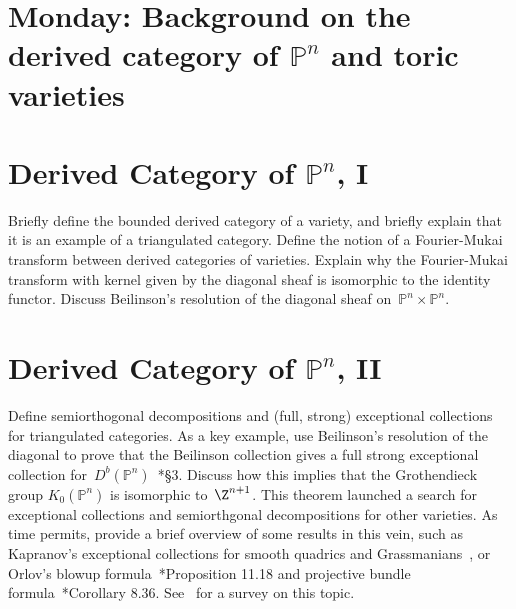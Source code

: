 \documentclass[11pt]{amsart}
\numberwithin{equation}{section}
\theoremstyle{definition}
\theoremstyle{remark}
\newcommand{\PP}{\mathbb P}
\begin{document}
\section*{Monday: Background on the derived category of $\PP^n$ and toric varieties}

\section{Derived Category of $\PP^n$, I}
Briefly define the bounded derived category of a variety, and briefly explain that it is an example of a triangulated category. Define the notion of a Fourier-Mukai transform between derived categories of varieties. Explain why the Fourier-Mukai transform with kernel given by the diagonal sheaf is isomorphic to the identity functor. Discuss Beilinson's resolution of the diagonal sheaf on~$\PP^n \times \PP^n$.

 

\section{Derived Category of $\PP^n$, II}
Define semiorthogonal decompositions and (full, strong) exceptional collections for triangulated categories. As a key example, use Beilinson's resolution of the diagonal to prove that the Beilinson collection gives a full strong exceptional collection for~$D^b(\PP^n)$~\cite{caldararu}*{\S 3}. Discuss how this implies that the Grothendieck group $K_0(\PP^n)$ is isomorphic to~$\Z^{n+1}$. %
This theorem launched a search for exceptional collections and semiorthgonal decompositions for other varieties.  As time permits, provide a brief overview of some results in this vein, such as Kapranov's exceptional collections for smooth quadrics and Grassmanians~\cite{kapranov}, or
Orlov's blowup formula~\cite{huybrechts}*{Proposition 11.18} and projective bundle formula~\cite{huybrechts}*{Corollary 8.36}. See~\cite{kuznetsov} for a survey on this topic.
\end{document}
